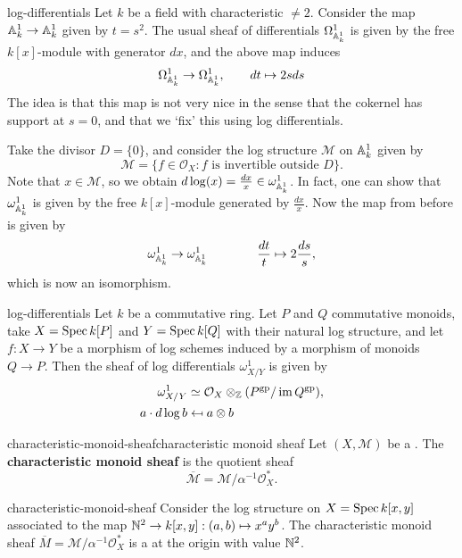 \begin{example}{log-differentials}
    Let $k$ be a field with characteristic $\ne 2$. Consider the map $\AA^1_k \to \AA^1_k$ given by $t = s^2$. The usual sheaf of differentials $\Omega^1_{\AA^1_k}$ is given by the free $k[x]$-module with generator $d x$, and the above map induces
    \[ \Omega^1_{\AA^1_k} \to \Omega^1_{\AA^1_k}, \qquad d t \mapsto 2 s d s \]
    The idea is that this map is not very nice in the sense that the cokernel has support at $s = 0$, and that we `fix' this using log differentials.
    
    Take the divisor $D = \{ 0 \}$, and consider the log structure $\mathcal{M}$ on $\AA^1_k$ given by
    \[ \mathcal{M} = \{ f \in \mathcal{O}_X : f \text{ is invertible outside } D \} . \]
    Note that $x \in \mathcal{M}$, so we obtain $d \log(x) = \frac{d x}{x} \in \omega^1_{\AA^1_k}$. In fact, one can show that $\omega^1_{\AA^1_k}$ is given by the free $k[x]$-module generated by $\frac{d x}{x}$. Now the map from before is given by
    \[ \omega^1_{\AA^1_k} \to \omega^1_{\AA^1_k} \qquad  \qquad \frac{d t}{t} \mapsto 2 \frac{d s} s , \]
    which is now an isomorphism.
\end{example}

\begin{example}{log-differentials}
    Let $k$ be a commutative ring. Let $P$ and $Q$ commutative monoids, take $X = \Spec k[P]$ and $Y = \Spec k[Q]$ with their natural log structure, and let $f : X \to Y$ be a morphism of log schemes induced by a morphism of monoids $Q \to P$. Then the sheaf of log differentials $\omega^1_{X/Y}$ is given by
    \[ \begin{aligned}
        \omega^1_{X/Y} &\simeq \mathcal{O}_X \otimes_\ZZ (P^\textup{gp} / \operatorname{im} Q^\textup{gp}) , \\
        a \cdot d \log b  &\mapsfrom a \otimes b
    \end{aligned} \]
\end{example}

\begin{topic}{characteristic-monoid-sheaf}{characteristic monoid sheaf}
    Let $(X, \mathcal{M})$ be a . The \textbf{characteristic monoid sheaf} is the quotient sheaf
    \[ \overline{\mathcal{M}} = \mathcal{M} / \alpha^{-1} \mathcal{O}_X^* . \]
\end{topic}

\begin{example}{characteristic-monoid-sheaf}
    Consider the log structure on $X = \Spec k[x, y]$ associated to the map $\NN^2 \to k[x, y] : (a, b) \mapsto x^a y^b$. The characteristic monoid sheaf $\overline{M} = \mathcal{M} / \alpha^{-1} \mathcal{O}_X^*$ is a  at the origin with value $\NN^2$.
\end{example}
